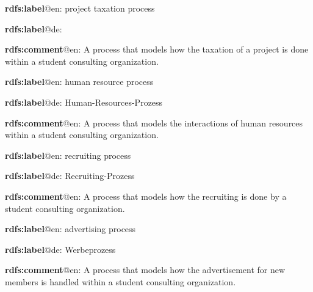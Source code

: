 \documentclass[a4paper, DIV=13, BCOR=0cm]{scrbook}
\begin{document}
\begin{mdframed}[style=onto-3, frametitle={Project\_Taxation\_Process}]
	{%
		\begin{compactitem}
			\item \textbf{rdfs:label}@en: project taxation process
			\item \textbf{rdfs:label}@de:
			\item \textbf{rdfs:comment}@en: A process that models how the taxation of a project is done within a student consulting organization.
		\end{compactitem}
	} %
\end{mdframed}

\begin{mdframed}[style=onto-1, frametitle={Human\_Ressource\_Process}]
	{%
		\begin{compactitem}
			\item \textbf{rdfs:label}@en: human resource process
			\item \textbf{rdfs:label}@de: Human-Resources-Prozess
			\item \textbf{rdfs:comment}@en: A process that models the interactions of human resources within a student consulting organization.
		\end{compactitem}
	} %
\end{mdframed}

\begin{mdframed}[style=onto-2, frametitle={Recruiting\_Process}]
	{%
		\begin{compactitem}
			\item \textbf{rdfs:label}@en: recruiting process
			\item \textbf{rdfs:label}@de: Recruiting-Prozess
			\item \textbf{rdfs:comment}@en: A process that models how the recruiting is done by a student consulting organization.
		\end{compactitem}
	} %
\end{mdframed}

\begin{mdframed}[style=onto-3, frametitle={Advertising\_Process}]
	{%
		\begin{compactitem}
			\item \textbf{rdfs:label}@en: advertising process
			\item \textbf{rdfs:label}@de: Werbeprozess
			\item \textbf{rdfs:comment}@en: A process that models how the advertisement for new members is handled within a student consulting organization.
		\end{compactitem}
	} %
\end{mdframed}
\end{document}
